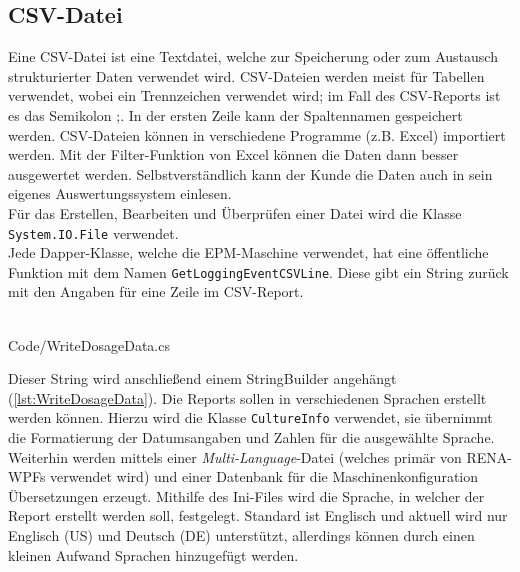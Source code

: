 \subsection{CSV-Datei}
Eine CSV-Datei ist eine Textdatei, welche zur Speicherung oder zum Austausch strukturierter Daten verwendet wird. CSV-Dateien werden meist für Tabellen verwendet, wobei ein Trennzeichen verwendet wird; im Fall des CSV-Reports ist es das Semikolon \glqq ;\grqq{}. In der ersten Zeile kann der Spaltennamen gespeichert werden. CSV-Dateien können in verschiedene Programme (z.B. Excel) importiert werden. Mit der Filter-Funktion von Excel können die Daten dann besser ausgewertet werden. Selbstverständlich kann der Kunde die Daten auch in sein eigenes Auswertungssystem einlesen.
\ \\
Für das Erstellen, Bearbeiten und Überprüfen einer Datei wird die Klasse \texttt{System.IO.File} verwendet.
\ \\
Jede Dapper-Klasse, welche die EPM-Maschine verwendet, hat eine öffentliche Funktion mit dem Namen \texttt{GetLoggingEventCSVLine}. Diese gibt ein String zurück mit den Angaben für eine Zeile im CSV-Report. 
\ \\
\begin{minipage}{\textwidth}
\ \\
 {Code/WriteDosageData.cs}
\ \\
\end{minipage}
Dieser String wird anschließend einem StringBuilder angehängt (\autoref{lst:WriteDosageData}). Die Reports sollen in verschiedenen Sprachen erstellt werden können. Hierzu wird die Klasse \texttt{CultureInfo} verwendet, sie übernimmt die Formatierung der Datumsangaben und Zahlen für die ausgewählte Sprache. Weiterhin werden mittels einer \textit{Multi-Language}-Datei (welches primär von RENA-WPFs verwendet wird) und einer Datenbank für die Maschinenkonfiguration Übersetzungen erzeugt. Mithilfe des Ini-Files wird die Sprache, in welcher der Report erstellt werden soll, festgelegt. Standard ist Englisch und aktuell wird nur Englisch (US) und Deutsch (DE) unterstützt, allerdings können durch einen kleinen Aufwand Sprachen hinzugefügt werden.


\ \\

